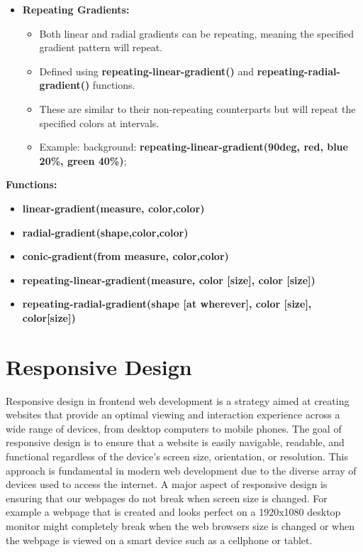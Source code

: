 \documentclass{report}
\begin{document}
\begin{itemize}
\begin{itemize}
    \end{itemize}
    \item \textbf{Repeating Gradients:}
    \begin{itemize}
        \item Both linear and radial gradients can be repeating, meaning the specified gradient pattern will repeat.
        \item Defined using \textbf{repeating-linear-gradient()} and \textbf{repeating-radial-gradient()} functions.
        \item These are similar to their non-repeating counterparts but will repeat the specified colors at intervals.
        \item Example: background: \textbf{repeating-linear-gradient(90deg, red, blue 20\%, green 40\%)};
    \end{itemize}
    \end{itemize}
    \bigbreak \noindent 
    \textbf{Functions:}
    \begin{itemize}
        \item \textbf{linear-gradient(measure, color,color)}
        \item \textbf{radial-gradient(shape,color,color)}
        \item \textbf{conic-gradient(from measure, color,color)}
        \item \textbf{repeating-linear-gradient(measure, color [size], color [size])}
        \item \textbf{repeating-radial-gradient(shape [at wherever], color [size], color[size])}
    \end{itemize}
    




    

    

    \pagebreak \bigbreak \noindent 
    \section{\LARGE Responsive Design}
    \bigbreak \noindent 
    \begin{concept}
        Responsive design in frontend web development is a strategy aimed at creating websites that provide an optimal viewing and interaction experience across a wide range of devices, from desktop computers to mobile phones. The goal of responsive design is to ensure that a website is easily navigable, readable, and functional regardless of the device's screen size, orientation, or resolution. This approach is fundamental in modern web development due to the diverse array of devices used to access the internet.
        \bigbreak \noindent 
        A major aspect of responsive design is ensuring that our webpages do not break when screen size is changed. For example a webpage that is created and looks perfect on a 1920x1080 desktop monitor might completely break when the web browsers size is changed or when the webpage is viewed on a smart device such as a cellphone or tablet.
    \end{concept}
    \bigbreak \noindent 
\end{document}
